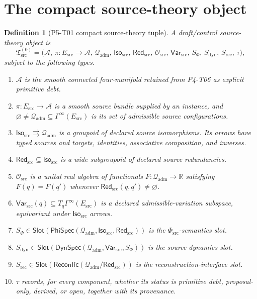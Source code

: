 \documentclass[11pt]{article}
\newcommand{\A}{\mathcal A}
\newcommand{\Esrc}{E_{\mathrm{src}}}
\newcommand{\Qadm}{\mathcal Q_{\mathrm{adm}}}
\newcommand{\Isosrc}{\mathsf{Iso}_{\mathrm{src}}}
\newcommand{\Redsrc}{\mathsf{Red}_{\mathrm{src}}}
\newcommand{\Osrc}{\mathcal O_{\mathrm{src}}}
\newcommand{\Varsrc}{\mathsf{Var}_{\mathrm{src}}}
\newcommand{\PhiSrc}{\Phi_{\mathrm{src}}}
\newcommand{\Slot}{\mathsf{Slot}}
\newcommand{\Recon}{\mathsf{ReconIfc}}
\newtheorem{definition}{Definition}
\begin{document}
\section{The compact source-theory object}

\begin{definition}[P5-T01 compact source-theory tuple]
A draft/control source-theory object is
\[
 \mathfrak T_{\mathrm{src}}^{(0)}
 =
 \bigl(
   \A,\,
   \pi:\Esrc\!\to\!\A,\,
   \Qadm,\,
   \Isosrc,\,
   \Redsrc,\,
   \Osrc,\,
   \Varsrc,\,
   S_{\Phi},\,
   S_{\mathrm{dyn}},\,
   S_{\mathrm{rec}},\,
   \tau
 \bigr),
\]
subject to the following types.

\begin{enumerate}[label=(\roman*)]
  \item \(\A\) is the smooth connected four-manifold retained from P4-T06 as
  explicit primitive debt.
  \item \(\pi:\Esrc\to\A\) is a smooth source bundle supplied by an
  instance, and
  \(\varnothing\ne\Qadm\subseteq\Gamma^\infty(\Esrc)\) is its set of
  admissible source configurations.
  \item \(\Isosrc\rightrightarrows\Qadm\) is a groupoid of declared source
  isomorphisms. Its arrows have typed sources and targets, identities,
  associative composition, and inverses.
  \item \(\Redsrc\subseteq\Isosrc\) is a wide subgroupoid of declared source
  redundancies.
  \item \(\Osrc\) is a unital real algebra of functionals
  \(F:\Qadm\to\mathbb R\) satisfying
  \(F(q)=F(q')\) whenever \(\Redsrc(q,q')\ne\varnothing\).
  \item \(\Varsrc(q)\subseteq T_q\Gamma^\infty(\Esrc)\) is a declared
  admissible-variation subspace, equivariant under \(\Isosrc\) arrows.
  \item
  \(S_{\Phi}\in\Slot(\mathsf{PhiSpec}(\Qadm,\Isosrc,\Redsrc))\) is the
  \(\PhiSrc\)-semantics slot.
  \item
  \(S_{\mathrm{dyn}}\in
    \Slot(\mathsf{DynSpec}(\Qadm,\Varsrc,S_{\Phi}))\)
  is the source-dynamics slot.
  \item
  \(S_{\mathrm{rec}}\in
    \Slot(\Recon(\Qadm/\Redsrc))\)
  is the reconstruction-interface slot.
  \item \(\tau\) records, for every component, whether its status is
  primitive debt, proposal-only, derived, or open, together with its
  provenance.
\end{enumerate}
\end{definition}
\end{document}
